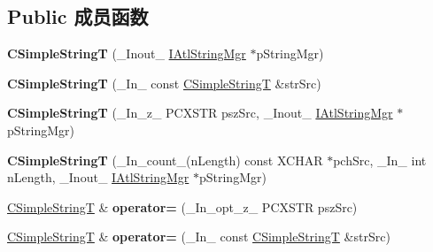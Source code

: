 \subsection*{Public 成员函数}
\begin{DoxyCompactItemize}
\item 
\mbox{\label{class_a_t_l_1_1_c_simple_string_t_aacb9909ace008afe48de359a5702cf45}} 
{\bfseries C\+Simple\+StringT} (\+\_\+\+Inout\+\_\+ \hyperlink{class_a_t_l_1_1_i_atl_string_mgr}{I\+Atl\+String\+Mgr} $\ast$p\+String\+Mgr)
\item 
\mbox{\label{class_a_t_l_1_1_c_simple_string_t_aa133e132c2f53f9b7cfb9b2be53b4fa6}} 
{\bfseries C\+Simple\+StringT} (\+\_\+\+In\+\_\+ const \hyperlink{class_a_t_l_1_1_c_simple_string_t}{C\+Simple\+StringT} \&str\+Src)
\item 
\mbox{\label{class_a_t_l_1_1_c_simple_string_t_a2f4b25b68d600c2db35c563ce597bf20}} 
{\bfseries C\+Simple\+StringT} (\+\_\+\+In\+\_\+z\+\_\+ P\+C\+X\+S\+TR psz\+Src, \+\_\+\+Inout\+\_\+ \hyperlink{class_a_t_l_1_1_i_atl_string_mgr}{I\+Atl\+String\+Mgr} $\ast$p\+String\+Mgr)
\item 
\mbox{\label{class_a_t_l_1_1_c_simple_string_t_a3f2ab661df3a3be8d1678ef74e9dbd45}} 
{\bfseries C\+Simple\+StringT} (\+\_\+\+In\+\_\+count\+\_\+(n\+Length) const X\+C\+H\+AR $\ast$pch\+Src, \+\_\+\+In\+\_\+ int n\+Length, \+\_\+\+Inout\+\_\+ \hyperlink{class_a_t_l_1_1_i_atl_string_mgr}{I\+Atl\+String\+Mgr} $\ast$p\+String\+Mgr)
\item 
\mbox{\label{class_a_t_l_1_1_c_simple_string_t_af9d43c3a5cb56f7bf6a02f812a01cdcc}} 
\hyperlink{class_a_t_l_1_1_c_simple_string_t}{C\+Simple\+StringT} \& {\bfseries operator=} (\+\_\+\+In\+\_\+opt\+\_\+z\+\_\+ P\+C\+X\+S\+TR psz\+Src)
\item 
\mbox{\label{class_a_t_l_1_1_c_simple_string_t_a5b3de2bc59b2dd035ea8dbad0b0d43d0}} 
\hyperlink{class_a_t_l_1_1_c_simple_string_t}{C\+Simple\+StringT} \& {\bfseries operator=} (\+\_\+\+In\+\_\+ const \hyperlink{class_a_t_l_1_1_c_simple_string_t}{C\+Simple\+StringT} \&str\+Src)
\item 

\end{DoxyCompactItemize}
